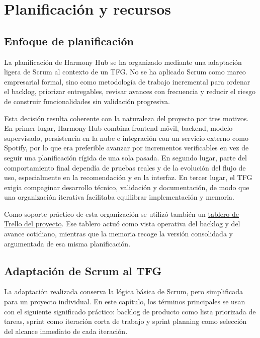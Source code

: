 \chapter{Planificación y recursos}
\label{ch:planificacion_recursos}

\section{Enfoque de planificación}
\label{sec:enfoque_planificacion}

La planificación de Harmony Hub se ha organizado mediante una adaptación ligera
de Scrum al contexto de un TFG. No se ha aplicado Scrum como marco empresarial
formal, sino como metodología de trabajo incremental para ordenar el backlog,
priorizar entregables, revisar avances con frecuencia y reducir el riesgo de
construir funcionalidades sin validación progresiva.

Esta decisión resulta coherente con la naturaleza del proyecto por tres
motivos. En primer lugar, Harmony Hub combina frontend móvil, backend, modelo
supervisado, persistencia en la nube e integración con un servicio externo como
Spotify, por lo que era preferible avanzar por incrementos verificables en vez
de seguir una planificación rígida de una sola pasada. En segundo lugar, parte
del comportamiento final dependía de pruebas reales y de la evolución del flujo
de uso, especialmente en la recomendación y en la interfaz. En tercer lugar, el
TFG exigía compaginar desarrollo técnico, validación y documentación, de modo
que una organización iterativa facilitaba equilibrar implementación y memoria.

Como soporte práctico de esta organización se utilizó también un
\href{https://trello.com/invite/b/69f0d52f02062b866ef2c7b1/ATTI8242c2e81725ea5b57b648b8e983e91652F5E110/harmony-hub}{tablero de Trello del proyecto}.
Ese tablero actuó como vista operativa del backlog y del avance cotidiano,
mientras que la memoria recoge la versión consolidada y argumentada de esa
misma planificación.

\section{Adaptación de Scrum al TFG}
\label{sec:adaptacion_scrum_tfg}

La adaptación realizada conserva la lógica básica de Scrum, pero simplificada
para un proyecto individual. En este capítulo, los términos principales se usan
con el siguiente significado práctico: backlog de producto como lista
priorizada de tareas, sprint como iteración corta de trabajo y
sprint planning como selección del alcance inmediato de cada iteración.

